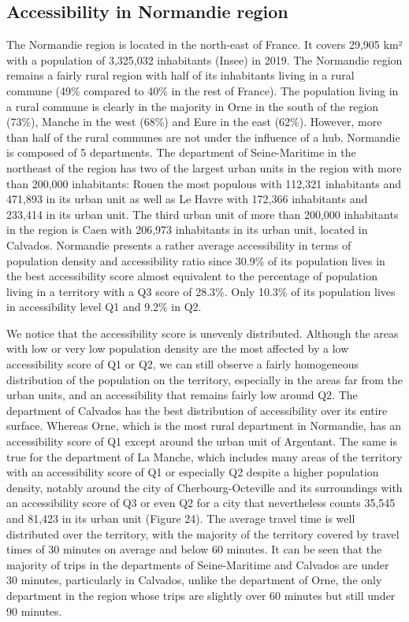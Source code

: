 \subsection*{Accessibility in Normandie region}

The Normandie region is located in the north-east of France. It covers 29,905
km² with a population of 3,325,032 inhabitants (Insee) in 2019. The Normandie
region remains a fairly rural region with half of its inhabitants living in a
rural commune (49\% compared to 40\% in the rest of France). The population
living in a rural commune is clearly in the majority in Orne in the south of the
region (73\%), Manche in the west (68\%) and Eure in the east (62\%). However,
more than half of the rural communes are not under the influence of a hub.
Normandie is composed of 5 departments. The department of Seine-Maritime in the
northeast of the region has two of the largest urban units in the region with
more than 200,000 inhabitants: Rouen the most populous with 112,321 inhabitants
and 471,893 in its urban unit as well as Le Havre with 172,366 inhabitants and
233,414 in its urban unit. The third urban unit of more than 200,000 inhabitants
in the region is Caen with 206,973 inhabitants in its urban unit, located in
Calvados. Normandie presents a rather average accessibility in terms of
population density and accessibility ratio since 30.9\% of its population lives
in the best accessibility score almost equivalent to the percentage of
population living in a territory with a Q3 score of 28.3\%. Only 10.3\% of its
population lives in accessibility level Q1 and 9.2\% in Q2.


We notice that the accessibility score is unevenly distributed. Although the
areas with low or very low population density are the most affected by a low
accessibility score of Q1 or Q2, we can still observe a fairly homogeneous
distribution of the population on the territory, especially in the areas far
from the urban units, and an accessibility that remains fairly low around Q2.
The department of Calvados has the best distribution of accessibility over its
entire surface. Whereas Orne, which is the most rural department in Normandie,
has an accessibility score of Q1 except around the urban unit of Argentant. The
same is true for the department of La Manche, which includes many areas of the
territory with an accessibility score of Q1 or especially Q2 despite a higher
population density, notably around the city of Cherbourg-Octeville and its
surroundings with an accessibility score of Q3 or even Q2 for a city that
nevertheless counts 35,545 and 81,423 in its urban unit (Figure 24). The average
travel time is well distributed over the territory, with the majority of the
territory covered by travel times of 30 minutes on average and below 60 minutes.
It can be seen that the majority of trips in the departments of Seine-Maritime
and Calvados are under 30 minutes, particularly in Calvados, unlike the
department of Orne, the only department in the region whose trips are slightly
over 60 minutes but still under 90 minutes.

